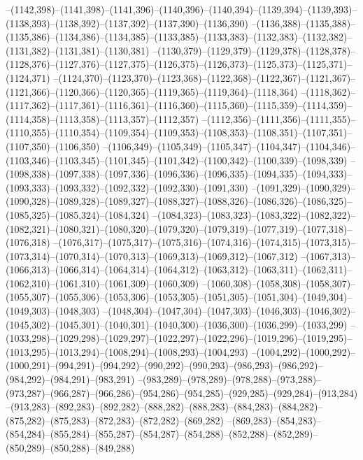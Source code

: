 --(1142,398)--(1141,398)--(1141,396)--(1140,396)--(1140,394)--(1139,394)--(1139,393)--(1138,393)--(1138,392)--(1137,392)--(1137,390)--(1136,390)
--(1136,388)--(1135,388)--(1135,386)--(1134,386)--(1134,385)--(1133,385)--(1133,383)--(1132,383)--(1132,382)--(1131,382)--(1131,381)--(1130,381)
--(1130,379)--(1129,379)--(1129,378)--(1128,378)--(1128,376)--(1127,376)--(1127,375)--(1126,375)--(1126,373)--(1125,373)--(1125,371)--(1124,371)
--(1124,370)--(1123,370)--(1123,368)--(1122,368)--(1122,367)--(1121,367)--(1121,366)--(1120,366)--(1120,365)--(1119,365)--(1119,364)--(1118,364)
--(1118,362)--(1117,362)--(1117,361)--(1116,361)--(1116,360)--(1115,360)--(1115,359)--(1114,359)--(1114,358)--(1113,358)--(1113,357)--(1112,357)
--(1112,356)--(1111,356)--(1111,355)--(1110,355)--(1110,354)--(1109,354)--(1109,353)--(1108,353)--(1108,351)--(1107,351)--(1107,350)--(1106,350)
--(1106,349)--(1105,349)--(1105,347)--(1104,347)--(1104,346)--(1103,346)--(1103,345)--(1101,345)--(1101,342)--(1100,342)--(1100,339)--(1098,339)
--(1098,338)--(1097,338)--(1097,336)--(1096,336)--(1096,335)--(1094,335)--(1094,333)--(1093,333)--(1093,332)--(1092,332)--(1092,330)--(1091,330)
--(1091,329)--(1090,329)--(1090,328)--(1089,328)--(1089,327)--(1088,327)--(1088,326)--(1086,326)--(1086,325)--(1085,325)--(1085,324)--(1084,324)
--(1084,323)--(1083,323)--(1083,322)--(1082,322)--(1082,321)--(1080,321)--(1080,320)--(1079,320)--(1079,319)--(1077,319)--(1077,318)--(1076,318)
--(1076,317)--(1075,317)--(1075,316)--(1074,316)--(1074,315)--(1073,315)--(1073,314)--(1070,314)--(1070,313)--(1069,313)--(1069,312)--(1067,312)
--(1067,313)--(1066,313)--(1066,314)--(1064,314)--(1064,312)--(1063,312)--(1063,311)--(1062,311)--(1062,310)--(1061,310)--(1061,309)--(1060,309)
--(1060,308)--(1058,308)--(1058,307)--(1055,307)--(1055,306)--(1053,306)--(1053,305)--(1051,305)--(1051,304)--(1049,304)--(1049,303)--(1048,303)
--(1048,304)--(1047,304)--(1047,303)--(1046,303)--(1046,302)--(1045,302)--(1045,301)--(1040,301)--(1040,300)--(1036,300)--(1036,299)--(1033,299)
--(1033,298)--(1029,298)--(1029,297)--(1022,297)--(1022,296)--(1019,296)--(1019,295)--(1013,295)--(1013,294)--(1008,294)--(1008,293)--(1004,293)
--(1004,292)--(1000,292)--(1000,291)--(994,291)--(994,292)--(990,292)--(990,293)--(986,293)--(986,292)--(984,292)--(984,291)--(983,291)
--(983,289)--(978,289)--(978,288)--(973,288)--(973,287)--(966,287)--(966,286)--(954,286)--(954,285)--(929,285)--(929,284)--(913,284)
--(913,283)--(892,283)--(892,282)--(888,282)--(888,283)--(884,283)--(884,282)--(875,282)--(875,283)--(872,283)--(872,282)--(869,282)
--(869,283)--(854,283)--(854,284)--(855,284)--(855,287)--(854,287)--(854,288)--(852,288)--(852,289)--(850,289)--(850,288)--(849,288)
